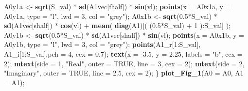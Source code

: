 \documentclass[]{article}
\newenvironment{Shaded}{\begin{snugshade}}{\end{snugshade}}
\newcommand{\KeywordTok}[1]{\textcolor[rgb]{0.13,0.29,0.53}{\textbf{{#1}}}}
\newcommand{\DataTypeTok}[1]{\textcolor[rgb]{0.13,0.29,0.53}{{#1}}}
\newcommand{\DecValTok}[1]{\textcolor[rgb]{0.00,0.00,0.81}{{#1}}}
\newcommand{\FloatTok}[1]{\textcolor[rgb]{0.00,0.00,0.81}{{#1}}}
\newcommand{\StringTok}[1]{\textcolor[rgb]{0.31,0.60,0.02}{{#1}}}
\newcommand{\OtherTok}[1]{\textcolor[rgb]{0.56,0.35,0.01}{{#1}}}
\newcommand{\NormalTok}[1]{{#1}}
\begin{document}
\begin{Shaded}
\begin{Highlighting}[]
    \NormalTok{A0y1a <-}\StringTok{ }\KeywordTok{sqrt}\NormalTok{(S_val) *}\StringTok{ }\KeywordTok{sd}\NormalTok{(A1vec[fhalf]) *}\StringTok{ }\KeywordTok{sin}\NormalTok{(vl);}
    \KeywordTok{points}\NormalTok{(}\DataTypeTok{x =} \NormalTok{A0x1a, }\DataTypeTok{y =} \NormalTok{A0y1a, }\DataTypeTok{type =} \StringTok{"l"}\NormalTok{, }\DataTypeTok{lwd =} \DecValTok{3}\NormalTok{, }\DataTypeTok{col =} \StringTok{"grey"}\NormalTok{);}
    \NormalTok{A0x1b <-}\StringTok{ }\KeywordTok{sqrt}\NormalTok{(}\FloatTok{0.5}\NormalTok{*S_val) *}\StringTok{ }\KeywordTok{sd}\NormalTok{(A1vec[shalf]) *}\StringTok{ }\KeywordTok{cos}\NormalTok{(vl) +}\StringTok{ }
\StringTok{                  }\KeywordTok{mean}\NormalTok{( }\KeywordTok{diag}\NormalTok{(A1)[( (}\FloatTok{0.5}\NormalTok{*S_val) +}\StringTok{ }\DecValTok{1} \NormalTok{):S_val] );}
    \NormalTok{A0y1b <-}\StringTok{ }\KeywordTok{sqrt}\NormalTok{(}\FloatTok{0.5}\NormalTok{*S_val) *}\StringTok{ }\KeywordTok{sd}\NormalTok{(A1vec[shalf]) *}\StringTok{ }\KeywordTok{sin}\NormalTok{(vl);}
    \KeywordTok{points}\NormalTok{(}\DataTypeTok{x =} \NormalTok{A0x1b, }\DataTypeTok{y =} \NormalTok{A0y1b, }\DataTypeTok{type =} \StringTok{"l"}\NormalTok{, }\DataTypeTok{lwd =} \DecValTok{3}\NormalTok{, }\DataTypeTok{col =} \StringTok{"grey"}\NormalTok{);}
    \KeywordTok{points}\NormalTok{(A1_r[}\DecValTok{1}\NormalTok{:S_val], A1_i[}\DecValTok{1}\NormalTok{:S_val],}\DataTypeTok{pch =} \DecValTok{4}\NormalTok{, }\DataTypeTok{cex =} \FloatTok{0.7}\NormalTok{);   }
    \KeywordTok{text}\NormalTok{(}\DataTypeTok{x =} \NormalTok{-}\FloatTok{3.5}\NormalTok{, }\DataTypeTok{y =} \FloatTok{2.25}\NormalTok{, }\DataTypeTok{labels =} \StringTok{"b"}\NormalTok{, }\DataTypeTok{cex =} \DecValTok{2}\NormalTok{);}
    \KeywordTok{mtext}\NormalTok{(}\DataTypeTok{side =} \DecValTok{1}\NormalTok{, }\StringTok{"Real"}\NormalTok{, }\DataTypeTok{outer =} \OtherTok{TRUE}\NormalTok{, }\DataTypeTok{line =} \DecValTok{3}\NormalTok{, }\DataTypeTok{cex =} \DecValTok{2}\NormalTok{);}
    \KeywordTok{mtext}\NormalTok{(}\DataTypeTok{side =} \DecValTok{2}\NormalTok{, }\StringTok{"Imaginary"}\NormalTok{, }\DataTypeTok{outer =} \OtherTok{TRUE}\NormalTok{, }\DataTypeTok{line =} \FloatTok{2.5}\NormalTok{, }\DataTypeTok{cex =} \DecValTok{2}\NormalTok{);}
\NormalTok{\}}
\KeywordTok{plot_Fig_1}\NormalTok{(}\DataTypeTok{A0 =} \NormalTok{A0, }\DataTypeTok{A1 =} \NormalTok{A1);}
\end{Highlighting}
\end{Shaded}
\end{document}
